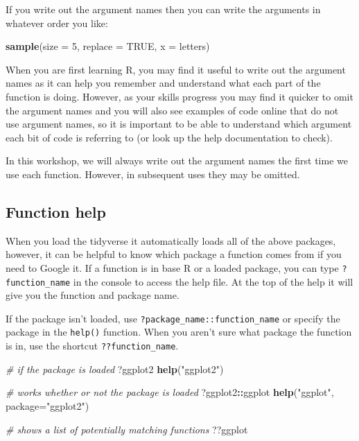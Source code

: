 \documentclass[
  oneside]{book}
\newenvironment{Shaded}{\begin{snugshade}}{\end{snugshade}}
\newcommand{\AttributeTok}[1]{\textcolor[rgb]{0.13,0.29,0.53}{#1}}
\newcommand{\CommentTok}[1]{\textcolor[rgb]{0.56,0.35,0.01}{\textit{#1}}}
\newcommand{\ConstantTok}[1]{\textcolor[rgb]{0.56,0.35,0.01}{#1}}
\newcommand{\DecValTok}[1]{\textcolor[rgb]{0.00,0.00,0.81}{#1}}
\newcommand{\FunctionTok}[1]{\textcolor[rgb]{0.13,0.29,0.53}{\textbf{#1}}}
\newcommand{\NormalTok}[1]{#1}
\newcommand{\SpecialCharTok}[1]{\textcolor[rgb]{0.81,0.36,0.00}{\textbf{#1}}}
\newcommand{\StringTok}[1]{\textcolor[rgb]{0.31,0.60,0.02}{#1}}
\begin{document}
If you write out the argument names then you can write the arguments in whatever order you like:

\begin{Shaded}
\begin{Highlighting}[]
\FunctionTok{sample}\NormalTok{(}\AttributeTok{size =} \DecValTok{5}\NormalTok{, }\AttributeTok{replace =} \ConstantTok{TRUE}\NormalTok{, }\AttributeTok{x =}\NormalTok{ letters)}
\end{Highlighting}
\end{Shaded}

When you are first learning R, you may find it useful to write out the argument names as it can help you remember and understand what each part of the function is doing. However, as your skills progress you may find it quicker to omit the argument names and you will also see examples of code online that do not use argument names, so it is important to be able to understand which argument each bit of code is referring to (or look up the help documentation to check).

In this workshop, we will always write out the argument names the first time we use each function. However, in subsequent uses they may be omitted.

\subsection{Function help}\label{function-help}

When you load the tidyverse it automatically loads all of the above packages, however, it can be helpful to know which package a function comes from if you need to Google it. If a function{} is in base R{} or a loaded package, you can type \texttt{?function\_name} in the console to access the help file. At the top of the help it will give you the function and package name.

If the package isn't loaded, use \texttt{?package\_name::function\_name} or specify the package in the \texttt{help()} function. When you aren't sure what package the function is in, use the shortcut \texttt{??function\_name}.

\begin{Shaded}
\begin{Highlighting}[]
\CommentTok{\# if the package is loaded}
\NormalTok{?ggplot2}
\FunctionTok{help}\NormalTok{(}\StringTok{"ggplot2"}\NormalTok{)}

\CommentTok{\# works whether or not the package is loaded}
\NormalTok{?ggplot2}\SpecialCharTok{::}\NormalTok{ggplot}
\FunctionTok{help}\NormalTok{(}\StringTok{"ggplot"}\NormalTok{, }\AttributeTok{package=}\StringTok{"ggplot2"}\NormalTok{) }

\CommentTok{\# shows a list of potentially matching functions}
\NormalTok{??ggplot}
\end{Highlighting}
\end{Shaded}
\end{document}
